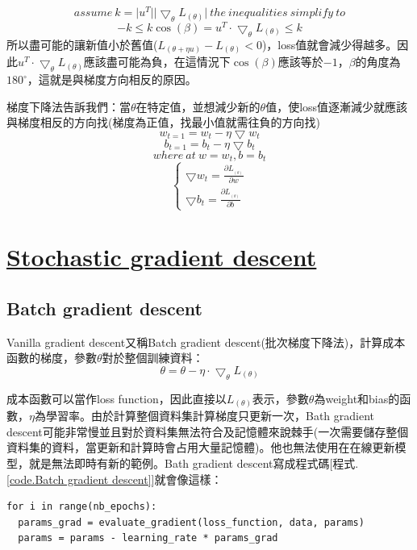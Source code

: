 \documentclass[13pt, a4paper]{report}
\begin{document}
$$assume\ k=\vert u^{T}\vert\vert \bigtriangledown_{\theta} L_{(\theta)}\vert \ the\  inequalities\ simplify\ to$$
$$-k \leq k\cos(\beta)=u^{T}\cdot\bigtriangledown_{\theta} L_{(\theta)}\leq k$$
所以盡可能的讓新值小於舊值($L_{(\theta+\eta u)}-L_{(\theta)}<0$)，loss值就會減少得越多。因此$u^{T}\cdot\bigtriangledown_{\theta} L_{(\theta)}$應該盡可能為負，在這情況下$\cos(\beta)$應該等於$-1$，$\beta$的角度為$180^{\circ} $，這就是與梯度方向相反的原因。

梯度下降法告訴我們：當$\theta$在特定值，並想減少新的$\theta$值，使loss值逐漸減少就應該與梯度相反的方向找(梯度為正值，找最小值就需往負的方向找)
$$w_{t=1}=w_t-\eta\bigtriangledown w_t$$
$$b_{t=1}=b_t-\eta\bigtriangledown b_t$$
$$where\ at\ w=w_t,b=b_t$$
$$
	\begin{cases}
	\bigtriangledown w_t=\frac{\partial L_{_{(\theta)}}}{\partial w}\\
	\bigtriangledown b_t=\frac{\partial L_{_{(\theta)}}}{\partial b}
	\end{cases}
$$
\newpage
\chapter{\href{https://ruder.io/optimizing-gradient-descent/}{Stochastic gradient descent}}
\section{Batch gradient descent}
Vanilla gradient descent又稱Batch gradient descent(批次梯度下降法)，計算成本函數的梯度，參數$\theta$對於整個訓練資料：
$$\theta=\theta-\eta\cdot\bigtriangledown_{\theta}L_{(\theta)}$$

成本函數可以當作loss function，因此直接以$L_{(\theta)}$表示，參數$\theta$為weight和bias的函數，$\eta$為學習率。由於計算整個資料集計算梯度只更新一次，Bath gradient descent可能非常慢並且對於資料集無法符合及記憶體來說棘手(一次需要儲存整個資料集的資料，當更新和計算時會占用大量記憶體)。他也無法使用在在線更新模型，就是無法即時有新的範例。Bath gradient descent寫成程式碼[程式.\ref{code.Batch gradient descent}]就會像這樣：

\begin{center}
\begin{lstlisting}[caption=Batch gradient descent]
for i in range(nb_epochs):
  params_grad = evaluate_gradient(loss_function, data, params)
  params = params - learning_rate * params_grad
\end{lstlisting}
\label{code.Batch gradient descent}
\end{center}
\end{document}
